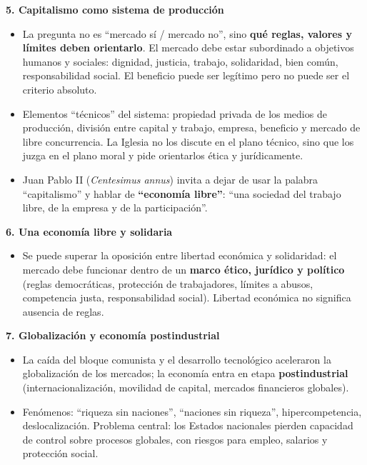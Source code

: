 \documentclass[10pt,a4paper]{article}
\begin{document}
\medskip\noindent \textbf{5. Capitalismo como sistema de producción}\par\nopagebreak
\begin{itemize}
\item La pregunta no es ``mercado sí / mercado no'', sino \textbf{qué reglas, valores y límites deben orientarlo}. El mercado debe estar subordinado a objetivos humanos y sociales: dignidad, justicia, trabajo, solidaridad, bien común, responsabilidad social. El beneficio puede ser legítimo pero no puede ser el criterio absoluto.
\item Elementos ``técnicos'' del sistema: propiedad privada de los medios de producción, división entre capital y trabajo, empresa, beneficio y mercado de libre concurrencia. La Iglesia no los discute en el plano técnico, sino que los juzga en el plano moral y pide orientarlos ética y jurídicamente.
\item Juan Pablo II (\textit{Centesimus annus}) invita a dejar de usar la palabra ``capitalismo'' y hablar de \textbf{``economía libre''}: ``una sociedad del trabajo libre, de la empresa y de la participación''.
\end{itemize}

\medskip\noindent \textbf{6. Una economía libre y solidaria}\par\nopagebreak
\begin{itemize}
\item Se puede superar la oposición entre libertad económica y solidaridad: el mercado debe funcionar dentro de un \textbf{marco ético, jurídico y político} (reglas democráticas, protección de trabajadores, límites a abusos, competencia justa, responsabilidad social). Libertad económica no significa ausencia de reglas.
\end{itemize}

\medskip\noindent \textbf{7. Globalización y economía postindustrial}\par\nopagebreak
\begin{itemize}
\item La caída del bloque comunista y el desarrollo tecnológico aceleraron la globalización de los mercados; la economía entra en etapa \textbf{postindustrial} (internacionalización, movilidad de capital, mercados financieros globales).
\item Fenómenos: ``riqueza sin naciones'', ``naciones sin riqueza'', hipercompetencia, deslocalización. Problema central: los Estados nacionales pierden capacidad de control sobre procesos globales, con riesgos para empleo, salarios y protección social.
\end{itemize}
\end{document}
